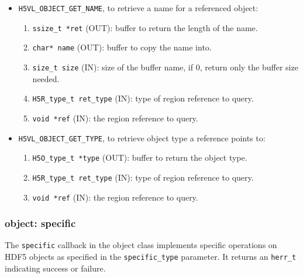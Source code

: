 \begin{itemize}
\item \texttt{H5VL\_OBJECT\_GET\_NAME}, to retrieve a name for a referenced object:
  \begin{enumerate}
  \item \texttt{ssize\_t *ret} (OUT): buffer to return the length of the
    name.
  \item \texttt{char* name} (OUT): buffer to copy the name into.
  \item \texttt{size\_t size} (IN): size of the buffer name, if 0, return
    only the buffer size needed.
  \item \texttt{H5R\_type\_t ret\_type} (IN): type of region reference to
    query.
  \item \texttt{void *ref} (IN): the region reference to query.
  \end{enumerate}
  
\item \texttt{H5VL\_OBJECT\_GET\_TYPE}, to retrieve object type a reference
  points to:
  \begin{enumerate}
  \item \texttt{H5O\_type\_t *type} (OUT): buffer to return the object type.
  \item \texttt{H5R\_type\_t ret\_type} (IN): type of region reference to
    query.
  \item \texttt{void *ref} (IN): the region reference to query.
  \end{enumerate}
\end{itemize}

\subsubsection{object: specific}
The \texttt{specific} callback in the object class implements specific operations on HDF5 objects as specified in the \texttt{specific\_type} parameter. It returns an \texttt{herr\_t} indicating success or failure.\bigskip

